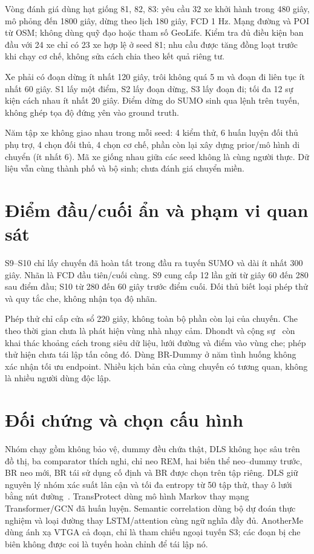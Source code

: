 Vòng đánh giá dùng hạt giống 81, 82, 83: yêu cầu 32 xe khởi hành trong 480 giây, mô phỏng đến 1800 giây, dừng theo lịch 180 giây, FCD 1 Hz. Mạng đường và POI từ OSM; không dùng quỹ đạo hoặc tham số GeoLife. Kiểm tra đủ điều kiện ban đầu với 24 xe chỉ có 23 xe hợp lệ ở seed 81; nhu cầu được tăng đồng loạt trước khi chạy cơ chế, không sửa cách chia theo kết quả riêng tư.

Xe phải có đoạn dừng ít nhất 120 giây, trôi không quá 5 m và đoạn đi liên tục ít nhất 60 giây. S1 lấy một điểm, S2 lấy đoạn dừng, S3 lấy đoạn đi; tối đa 12 sự kiện cách nhau ít nhất 20 giây. Điểm dừng do SUMO sinh qua lệnh trên tuyến, không ghép tọa độ đứng yên vào ground truth.

Năm tập xe không giao nhau trong mỗi seed: 4 kiểm thử, 6 huấn luyện đối thủ phụ trợ, 4 chọn đối thủ, 4 chọn cơ chế, phần còn lại xây dựng prior/mô hình di chuyển (ít nhất 6). Mã xe giống nhau giữa các seed không là cùng người thực. Dữ liệu vẫn cùng thành phố và bộ sinh; chưa đánh giá chuyển miền.

\section{Điểm đầu/cuối ẩn và phạm vi quan sát}

S9--S10 chỉ lấy chuyến đã hoàn tất trong đầu ra tuyến SUMO và dài ít nhất 300 giây. Nhãn là FCD đầu tiên/cuối cùng. S9 cung cấp 12 lần gửi từ giây 60 đến 280 sau điểm đầu; S10 từ 280 đến 60 giây trước điểm cuối. Đối thủ biết loại phép thử và quy tắc che, không nhận tọa độ nhãn.

Phép thử chỉ cấp cửa sổ 220 giây, không toàn bộ phần còn lại của chuyến. Che theo thời gian chưa là phát hiện vùng nhà nhạy cảm. Dhondt và cộng sự~\cite{dhondt2022endpoint} còn khai thác khoảng cách trong siêu dữ liệu, lưới đường và điểm vào vùng che; phép thử hiện chưa tái lập tấn công đó. Dùng BR-Dummy ở năm tình huống không xác nhận tối ưu endpoint. Nhiều kịch bản của cùng chuyến có tương quan, không là nhiều người dùng độc lập.

\section{Đối chứng và chọn cấu hình}

Nhóm chạy gồm không bảo vệ, dummy đều chứa thật, DLS không học sâu trên đồ thị, ba comparator thích nghi, chỉ neo REM, hai biến thể neo--dummy trước, BR neo mới, BR tái sử dụng cố định và BR được chọn trên tập riêng. DLS giữ nguyên lý nhóm xác suất lân cận và tối đa entropy từ 50 tập thử, thay ô lưới bằng nút đường~\cite{niu2014dls}. TransProtect dùng mô hình Markov thay mạng Transformer/GCN đã huấn luyện. Semantic correlation dùng bộ dự đoán thực nghiệm và loại đường thay LSTM/attention cùng ngữ nghĩa đầy đủ. AnotherMe dùng ánh xạ VTGA cả đoạn, chỉ là tham chiếu ngoại tuyến S3; các đoạn bị che biên không được coi là tuyến hoàn chỉnh để tái lập nó.

